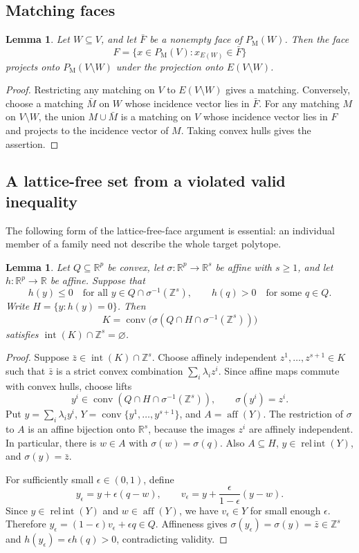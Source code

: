 \documentclass[11pt]{article}
\newtheorem{lemma}[theorem]{Lemma}
\theoremstyle{definition}
\DeclareMathOperator{\conv}{conv}
\DeclareMathOperator{\aff}{aff}
\DeclareMathOperator{\intr}{int}
\DeclareMathOperator{\relint}{rel\,int}
\newcommand{\R}{\mathbb R}
\newcommand{\Z}{\mathbb Z}
\newcommand{\PM}{P_{\mathrm M}}
\begin{document}
\subsection{Matching faces}

\begin{lemma}\label{lem:matchingface}
Let $W\subseteq V$, and let $\bar F$ be a nonempty face of $\PM(W)$.
Then the face
\[
 F=\{x\in\PM(V):x_{E(W)}\in\bar F\}
\]
projects onto $\PM(V\setminus W)$ under the projection onto $E(V\setminus W)$.
\end{lemma}

\begin{proof}
Restricting any matching on $V$ to $E(V\setminus W)$ gives a matching.
Conversely, choose a matching $\bar M$ on $W$ whose incidence vector lies in
$\bar F$. For any matching $M$ on $V\setminus W$, the union $M\cup\bar M$
is a matching on $V$ whose incidence vector lies in $F$ and projects to the
incidence vector of $M$. Taking convex hulls gives the assertion.
\end{proof}

\subsection{A lattice-free set from a violated valid inequality}
The following form of the lattice-free-face argument is essential: an individual
member of a family need not describe the whole target polytope.

\begin{lemma}\label{lem:latticefree}
Let $Q\subseteq\R^p$ be convex, let $\sigma:\R^p\to\R^s$ be affine with
$s\geq1$, and let $h:\R^p\to\R$ be affine. Suppose that
\[
 h(y)\leq0\quad\text{for all }y\in Q\cap\sigma^{-1}(\Z^s),
 \qquad h(q)>0\quad\text{for some }q\in Q.
\]
Write $H=\{y:h(y)=0\}$. Then
\[
 K=\conv\bigl(\sigma(Q\cap H\cap\sigma^{-1}(\Z^s))\bigr)
\]
satisfies $\intr(K)\cap\Z^s=\varnothing$.
\end{lemma}

\begin{proof}
Suppose $\bar z\in\intr(K)\cap\Z^s$. Choose affinely independent
$z^1,\ldots,z^{s+1}\in K$ such that $\bar z$ is a strict convex combination
$\sum_i\lambda_i z^i$. Since affine maps commute with convex hulls, choose
lifts
\[
 y^i\in\conv(Q\cap H\cap\sigma^{-1}(\Z^s)),
 \qquad \sigma(y^i)=z^i.
\]
Put $y=\sum_i\lambda_i y^i$, $Y=\conv\{y^1,\ldots,y^{s+1}\}$, and
$A=\aff(Y)$. The restriction of $\sigma$ to $A$ is an affine bijection
onto $\R^s$, because the images $z^i$ are affinely independent. In particular,
there is $w\in A$ with $\sigma(w)=\sigma(q)$. Also $A\subseteq H$,
$y\in\relint(Y)$, and $\sigma(y)=\bar z$.

For sufficiently small $\epsilon\in(0,1)$, define
\[
 y_\epsilon=y+\epsilon(q-w),\qquad
 v_\epsilon=y+\frac{\epsilon}{1-\epsilon}(y-w).
\]
Since $y\in\relint(Y)$ and $w\in\aff(Y)$, we have $v_\epsilon\in Y$ for
small enough $\epsilon$. Therefore
$y_\epsilon=(1-\epsilon)v_\epsilon+\epsilon q\in Q$.
Affineness gives $\sigma(y_\epsilon)=\sigma(y)=\bar z\in\Z^s$ and
$h(y_\epsilon)=\epsilon h(q)>0$, contradicting validity.
\end{proof}
\end{document}
